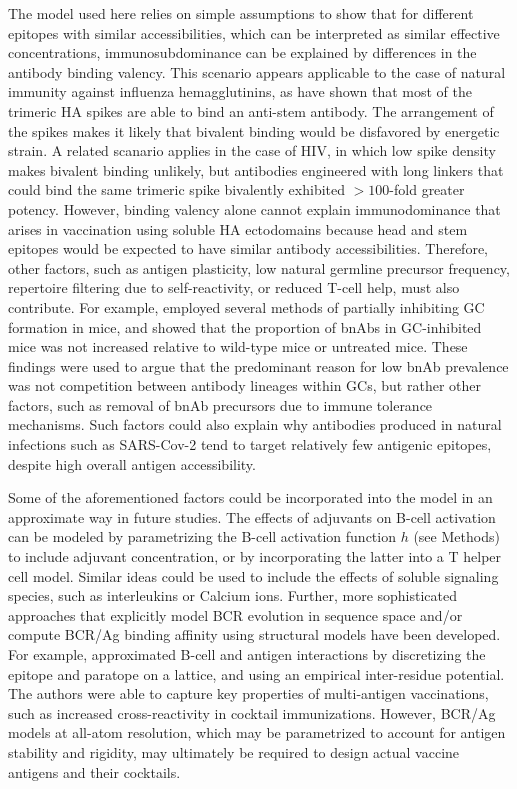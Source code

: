 \documentclass[utf8]{frontiersHLTH}%
\newcommand{\cred}[1]{\textsf{\color{red}#1}}
\begin{document}
\cred{The model used here relies on simple assumptions to show that for different
epitopes with similar accessibilities, which can be interpreted as
similar effective concentrations, immunosubdominance can be explained by
differences in the antibody binding valency. This scenario appears
applicable to the case of  natural immunity against influenza
hemagglutinins, as \citet{harris13} have shown that most of the trimeric
HA spikes are able to bind an anti-stem antibody. The arrangement of the
spikes makes it likely that bivalent binding would be disfavored by energetic
strain.\cite{harris13,amitai20} A related scanario applies in the
case of HIV, in which low spike density makes bivalent binding unlikely,
but antibodies engineered with long linkers  that could bind the same
trimeric spike bivalently exhibited $>100$-fold greater potency.\cite{galimidi15}
}
%
\cred{
However, binding valency alone cannot explain immunodominance 
that arises in vaccination using soluble HA ectodomains because
head and stem epitopes would be expected to have similar antibody accessibilities.
Therefore, other factors, such as antigen plasticity, low natural germline
precursor frequency, repertoire filtering due to self-reactivity, or
reduced T-cell help,\cite{erwin20} must also contribute.
}
%
\cred{For example, \citet{keating20} employed several methods of partially inhibiting GC
formation in mice, and showed that the proportion of bnAbs in GC-inhibited
mice was not increased relative to wild-type mice or untreated mice. These
findings were used to argue that the predominant reason for low bnAb
prevalence was not competition between antibody lineages within GCs, but rather other
factors, such as removal of bnAb precursors due to immune tolerance
mechanisms.\cite{keating20} Such factors could also explain
why antibodies produced in natural infections such as SARS-Cov-2 tend to target relatively
few antigenic epitopes, despite high overall antigen accessibility.\cite{barnes20}}

Some of the aforementioned factors could be incorporated into the model
in an approximate way in future studies.
%
\cred{The effects of adjuvants on B-cell activation can be modeled by
parametrizing the B-cell activation function $h$ (see Methods) to include
adjuvant concentration, or by incorporating the latter into a T helper cell model.
Similar ideas could be used to include the effects of soluble signaling
species, such as interleukins or Calcium ions.}
%
\cred{Further, more sophisticated approaches that explicitly model BCR evolution in
sequence space and/or compute BCR/Ag binding affinity using structural models have been developed.
For example, \citet{robert21}
approximated B-cell and antigen interactions by discretizing the epitope
and paratope on a lattice, and using an empirical inter-residue
potential.\cite{robert21} The authors were able to capture key properties 
of multi-antigen vaccinations, such as increased cross-reactivity in
cocktail immunizations.}
%
\cred{
However, BCR/Ag models at all-atom resolution,\cite{conti21,sprenger21}
which may be parametrized to account for antigen stability and rigidity,
may ultimately be required to design actual vaccine antigens and their
cocktails.
}
\end{document}
